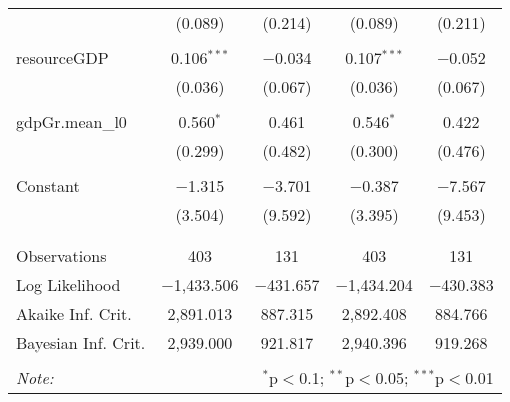 \begin{table}[!htbp]
\begin{tabular}{@{\extracolsep{5pt}}lcccc}
  & (0.089) & (0.214) & (0.089) & (0.211) \\ 
  & & & & \\ 
 resourceGDP & 0.106$^{***}$ & $-$0.034 & 0.107$^{***}$ & $-$0.052 \\ 
  & (0.036) & (0.067) & (0.036) & (0.067) \\ 
  & & & & \\ 
 gdpGr.mean\_l0 & 0.560$^{*}$ & 0.461 & 0.546$^{*}$ & 0.422 \\ 
  & (0.299) & (0.482) & (0.300) & (0.476) \\ 
  & & & & \\ 
 Constant & $-$1.315 & $-$3.701 & $-$0.387 & $-$7.567 \\ 
  & (3.504) & (9.592) & (3.395) & (9.453) \\ 
  & & & & \\ 
\hline \\[-1.8ex] 
Observations & 403 & 131 & 403 & 131 \\ 
Log Likelihood & $-$1,433.506 & $-$431.657 & $-$1,434.204 & $-$430.383 \\ 
Akaike Inf. Crit. & 2,891.013 & 887.315 & 2,892.408 & 884.766 \\ 
Bayesian Inf. Crit. & 2,939.000 & 921.817 & 2,940.396 & 919.268 \\ 
\hline 
\hline \\[-1.8ex] 
\textit{Note:}  & \multicolumn{4}{r}{$^{*}$p$<$0.1; $^{**}$p$<$0.05; $^{***}$p$<$0.01} \\ 
\end{tabular} 
\end{table}  
